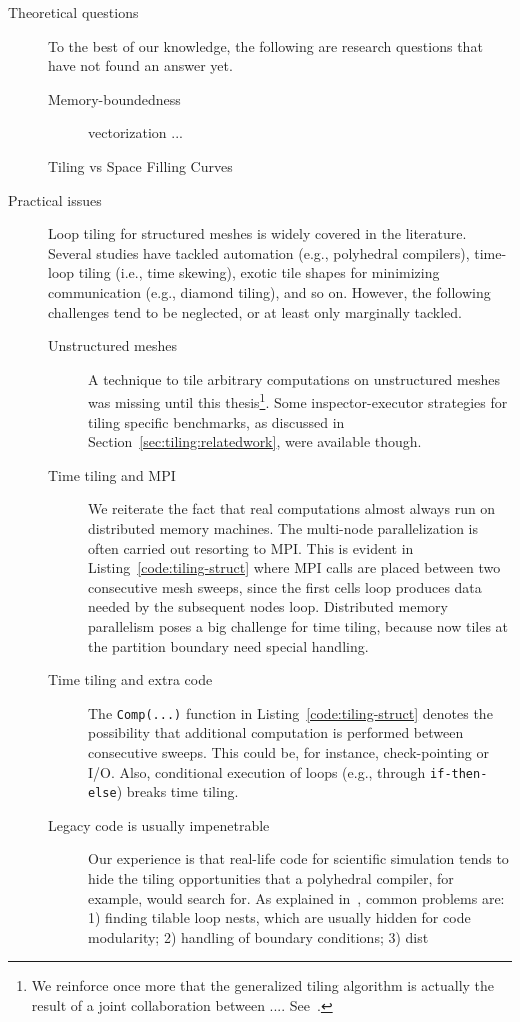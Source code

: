 \begin{description}
\item[Theoretical questions] To the best of our knowledge, the following are research questions that have not found an answer yet. 
\begin{description}
\item[Memory-boundedness] vectorization ...
\item[Tiling vs Space Filling Curves]
\end{description}

\item[Practical issues] Loop tiling for structured meshes is widely covered in the literature. Several studies have tackled automation (e.g., polyhedral compilers), time-loop tiling (i.e., time skewing), exotic tile shapes for minimizing communication (e.g., diamond tiling), and so on. However, the following challenges tend to be neglected, or at least only marginally tackled.
\begin{description}
\item[Unstructured meshes] A technique to tile arbitrary computations on unstructured meshes was missing until this thesis\footnote{We reinforce once more that the generalized tiling algorithm is actually the result of a joint collaboration between .... See~\cite{st-paper}.}. Some inspector-executor strategies for tiling specific benchmarks, as discussed in Section~\ref{sec:tiling:relatedwork}, were available though. 
\item[Time tiling and MPI] We reiterate the fact that real computations almost always run on distributed memory machines. The multi-node parallelization is often carried out resorting to MPI. This is evident in Listing~\ref{code:tiling-struct} where MPI calls are placed between two consecutive mesh sweeps, since the first cells loop produces data needed by the subsequent nodes loop. Distributed memory parallelism poses a big challenge for time tiling, because now tiles at the partition boundary need special handling.
\item[Time tiling and extra code] The \texttt{Comp(...)} function in Listing~\ref{code:tiling-struct} denotes the possibility that additional computation is performed between consecutive sweeps. This could be, for instance, check-pointing or I/O. Also, conditional execution of loops (e.g., through \texttt{if-then-else}) breaks time tiling. 
\item[Legacy code is usually impenetrable] Our experience is that real-life code for scientific simulation tends to hide the tiling opportunities that a polyhedral compiler, for example, would search for. As explained in~\cite{strout-common-problems}, common problems are: 1) finding tilable loop nests, which are usually hidden for code modularity; 2) handling of boundary conditions; 3) dist
\end{description}


\end{description}
